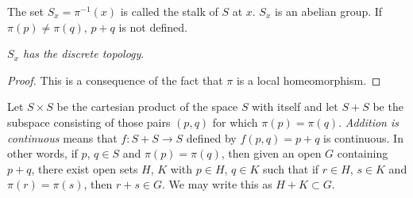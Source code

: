 The set $S_x = \pi^{-1}(x)$ is called the stalk of $S$ at $x$. $S_x$ is
an abelian group. If $\pi(p) \neq \pi(q)$, $p+q$ is not defined. 

\textit{$S_x$ has the discrete topology}.

\begin{proof}
This is a consequence of the fact that $\pi$ is a local
homeomorphism. 
\end{proof}

Let $S \times S$ be the cartesian product of the space $S$ with itself
and let $S + S$ be the subspace consisting of those pairs $(p,q)$ for
which $\pi(p) = \pi(q)$. \textit{Addition is continuous} means that
$f:S+S \to S$ defined by $f(p,q)=p+q$ is continuous. In other words,
if $p$, $q \in S$ and $\pi (p)= \pi(q)$, then given an open $G$
containing $p+q$, there exist open sets $H$, $K$ with $p \in H$, $q \in K$
such that if $r \in H$, $s \in K$ and $\pi(r) = \pi(s)$, then $r+s \in
G$. We may write this as $H + K \subset G$. 

